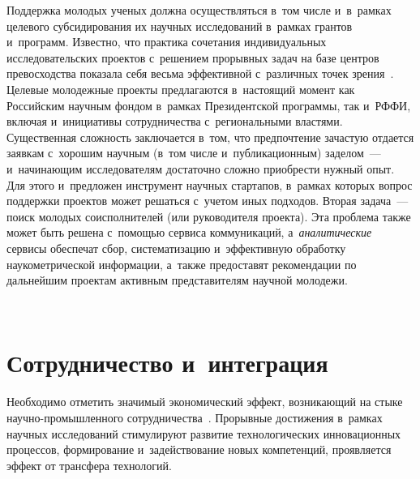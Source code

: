 \begin{multicols}{2}
{ }

Поддержка молодых ученых должна осуществляться в~том числе и~в~рамках целевого 
субсидирования их научных исследований в~рамках грантов и~программ. Известно, 
что практика сочетания индивидуальных исследовательских проектов с~решением 
прорывных задач на базе центров превосходства показала себя весьма 
эффективной с~различных точек зрения~\cite{Fortin2013}. Целевые молодежные 
проекты предлагаются в~настоящий момент как Российским научным фондом в~рамках 
Президентской программы, так и~РФФИ, включая и~инициативы сотрудничества с~региональными
 властями. Существенная сложность заключается в~том, что предпочтение зачастую 
 отдается заявкам с~хорошим научным (в~том числе и~публикационным) заделом~--- 
 и~начинающим исследователям достаточно сложно приобрести нужный опыт. Для 
 этого и~предложен инструмент научных стартапов, в~рамках которых вопрос 
 поддержки проектов может решаться с~учетом иных подходов. Вторая задача~--- 
 поиск молодых соисполнителей (или руководителя проекта). Эта проблема также может 
 быть решена с~помощью сервиса коммуникаций, а~\textit{аналитические} сервисы 
 обеспечат сбор, систематизацию и~эффективную обработку наукометрической 
 информации, а~также предоставят рекомендации по дальнейшим проектам активным 
 представителям научной молодежи.

 \setcounter{figure}{2}
\begin{figure*}[b] %
\vspace*{1pt}
 \begin{center}
 \mbox{%
 \epsfxsize=157.723mm 
 }
 \end{center}
\vspace*{-9pt}

\label{FigBarriersServices}
\end{figure*}

 
 \vspace*{-9pt}

\section{Сотрудничество и~интеграция}

Необходимо отметить значимый экономический эффект, возникающий на стыке 
на\-уч\-но-про\-мыш\-лен\-но\-го сотрудничества~\cite{Vuola2006}. 
Прорывные достижения в~рамках научных исследований стимулируют развитие 
технологических инновационных процессов, формирование и~задействование 
новых компетенций, проявляется эффект от трансфера технологий. 


\end{multicols}

